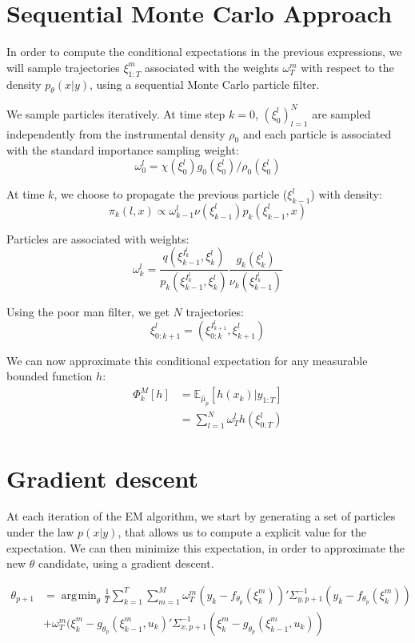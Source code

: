 \documentclass[10pt,a4paper]{report}
\DeclareMathOperator*{\argmin}{\arg\!\min}
\begin{document}
\section{Sequential Monte Carlo Approach}
In order to compute the conditional expectations in the previous expressions, we will sample trajectories $\xi_{1:T}^m$ associated with the weights $\omega_T^m$ with respect to the density $p_{\theta}(x | y)$, using a sequential Monte Carlo particle filter.

We sample particles iteratively. At time step $k=0$, $(\xi_0^l)_{l=1}^N$ are sampled independently from the instrumental density $\rho_0$ and each particle is associated with the standard importance sampling weight:
$$\omega_0^l=\chi(\xi_0^l) g_0(\xi_0^l) / \rho_0(\xi_0^l)$$

At time $k$, we choose to propagate the previous particle ($\xi_{k-1}^l$) with density:
$$\pi_k(l, x) \propto \omega_{k-1}^l \nu(\xi_{k-1}^l) p_k(\xi_{k-1}^l, x) $$

Particles are associated with weights:
$$\omega_k^l = \frac{q(\xi_{k-1}^{I_k^l}, \xi_k^l)}{p_k(\xi_{k-1}^{I_k^l}, \xi_k^l)} \frac{g_k(\xi_k^l)}{\nu_k(\xi_{k-1}^{I_k^l})}$$

Using the poor man filter, we get $N$ trajectories:
$$\xi_{0:k+1}^{l} = (\xi_{0:k}^{I_{k+1}^l}, \xi_{k+1}^l)$$

We can now approximate this conditional expectation for any measurable bounded function $h$:
\begin{align*}
    \Phi_k^M[h] & = \mathbb{E}_{\hat \mu_p} \left[ h(x_k) | y_{1:T} \right] \\
                & = \sum_{l=1}^N \omega_T^l h(\xi_{0:T}^l)
\end{align*}

\section{Gradient descent}
At each iteration of the EM algorithm, we start by generating a set of particles under the law $p(x|y)$, that allows us to compute a explicit value for the expectation. We can then minimize this expectation, in order to approximate the new $\theta$ candidate, using a gradient descent.

\begin{align*}
    \theta_{p+1} & = \argmin_{\theta} \frac{1}{T}\sum_{k=1}^T \sum_{m=1}^M \omega_T^m (y_k - f_{\theta_p}(\xi_k^m))' \Sigma_{y, p+1}^{-1} (y_k - f_{\theta_p}(\xi_k^m)) \\
                 & + \omega_T^m (\xi_k^m - g_{\theta_p}(\xi_{k-1}^m, u_k)'\Sigma_{x, p+1}^{-1}(\xi_k^m - g_{\theta_p}(\xi_{k-1}^m, u_k))
\end{align*}
\end{document}
